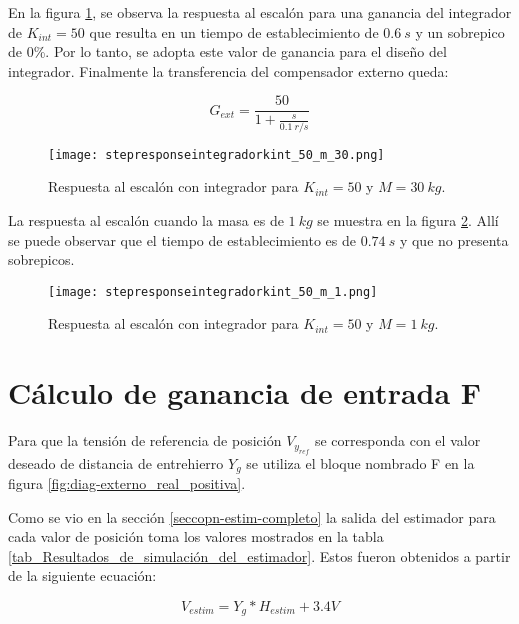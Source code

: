 \noindent En la figura \ref{fig:respuesta-al-escalon-con-k-50-M-30}, se observa la respuesta al escalón para una ganancia del integrador de $K_{int}=50$ que resulta en un tiempo de establecimiento de $0.6\:s$ y un sobrepico de 0\%. Por lo tanto, se adopta este valor de ganancia para el diseño del integrador. Finalmente la transferencia del compensador externo queda:

\begin{equation} \label{eq_gexterno}
	G_{ext}=\frac{50}{1+\frac{s}{0.1\:r/s}}	
\end{equation}

\begin{figure}[H]
	\centering
	\texttt{[image: stepresponseintegradorkint\_50\_m\_30.png]}
	\caption{Respuesta al escalón con integrador para $K_{int}=50$ y $M = 30\:kg$.}
	\label{fig:respuesta-al-escalon-con-k-50-M-30}
\end{figure}

\noindent La respuesta al escal\'{o}n cuando la masa es de $1 \:kg$ se muestra en la figura \ref{fig:respuesta-al-escalon-con-k-50-M-1}. All\'{i} se puede observar que el tiempo de establecimiento es de $0.74\:s$ y que no presenta sobrepicos.

\begin{figure}[H]
	\centering
	\texttt{[image: stepresponseintegradorkint\_50\_m\_1.png]}
	\caption{Respuesta al escalón con integrador para $K_{int} =50$ y $M = 1 \:kg$.}
	\label{fig:respuesta-al-escalon-con-k-50-M-1}
\end{figure}


\section{Cálculo de ganancia de entrada F} \label{sec_calculo_F}

Para que la tensión de referencia de posición $V_{y_{ref}}$ se corresponda con el valor deseado de distancia de entrehierro $Y_g$ se utiliza el bloque nombrado F en la figura \ref{fig:diag-externo_real_positiva}. 

Como se vio en la sección \ref{seccopn-estim-completo} la salida del estimador para cada valor de posición toma los  valores mostrados en la tabla \ref{tab_Resultados_de_simulación_del_estimador}. Estos fueron obtenidos a partir de la siguiente ecuación:

\begin{equation}
	V_{estim}=Y_g*H_{estim}+3.4V
\end{equation}


